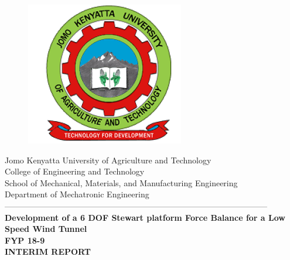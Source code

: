 \documentclass[12pt,fleqn]{article}
\begin{document}
\begin{titlepage}
  \begin{center}
      \vspace*{-4.0cm}
    \begin{figure}[!h]
\centering
\includegraphics[width=0.3\linewidth]{Figures/JKUAT_logo}
\label{fig:jomologo}
\end{figure}
   \large{Jomo Kenyatta University of Agriculture and Technology}\\
    \large{College of Engineering and Technology}\\
    \large{School of Mechanical, Materials, and Manufacturing Engineering}\\
   \large{Department of Mechatronic Engineering}\\

    ------------------------------------------------------------------------------------------------\\[1.0cm]
    \vspace{0.1cm}
    \LARGE{\textbf{Development of a 6 DOF Stewart platform
        Force Balance for a Low Speed Wind Tunnel}}\\
    \vspace{0.3cm}
    \LARGE{\textbf{FYP 18-9
            }}\\
    {\textbf{INTERIM REPORT
                }}\\[0.4cm]


\end{center}
\end{titlepage}
\end{document}
